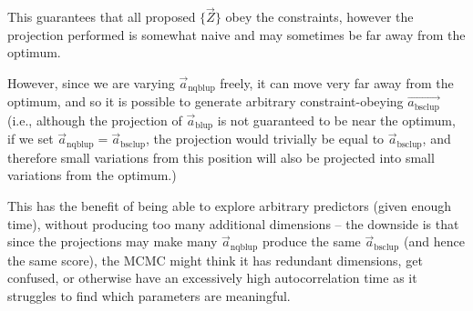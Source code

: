 \documentclass[]{article}
\begin{document}
				This guarantees that all proposed $\{\vec{Z}\}$ obey the constraints, however the projection performed is somewhat naive and may sometimes be far away from the optimum. 

				However, since we are varying $\vec{a}_\text{nqblup}$ freely, it can move very far away from the optimum, and so it is possible to generate arbitrary constraint-obeying $\vec{a_\text{bsclup}}$ (i.e., although the projection of $\vec{a}_\text{blup}$ is not guaranteed to be near the optimum, if we set $\vec{a}_\text{nqblup} = \vec{a}_\text{bsclup}$, the projection would trivially be equal to $\vec{a}_\text{bsclup}$, and therefore small variations from this position will also be projected into small variations from the optimum.)

				This has the benefit of being able to explore arbitrary predictors (given enough time), without producing too many additional dimensions -- the downside is that since the projections may make many $\vec{a}_\text{nqblup}$ produce the same $\vec{a}_\text{bsclup}$ (and hence the same score), the MCMC might think it has redundant dimensions, get confused, or otherwise have an excessively high autocorrelation time as it struggles to find which parameters are meaningful.
\end{document}
